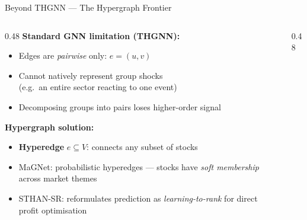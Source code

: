 \documentclass[aspectratio=169, 10pt]{beamer}
\begin{document}
\begin{frame}{Beyond THGNN — The Hypergraph Frontier}
  \begin{columns}[T]
    \begin{column}{0.48\textwidth}
      \textbf{Standard GNN limitation (THGNN):}
      \begin{itemize}
        \item Edges are \emph{pairwise} only: $e = (u, v)$
        \item Cannot natively represent group shocks\\
              (e.g.\ an entire sector reacting to one event)
        \item Decomposing groups into pairs loses higher-order signal
      \end{itemize}
      \bigskip
      \textbf{Hypergraph solution:}
      \begin{itemize}
        \item \textbf{Hyperedge} $e \subseteq V$: connects any subset of stocks
        \item MaGNet: probabilistic hyperedges —
              stocks have \emph{soft membership} across market themes
        \item STHAN-SR: reformulates prediction as
              \emph{learning-to-rank} for direct profit optimisation
      \end{itemize}
    \end{column}
    \begin{column}{0.48\textwidth}
\end{column}
\end{columns}
\end{frame}
\end{document}
